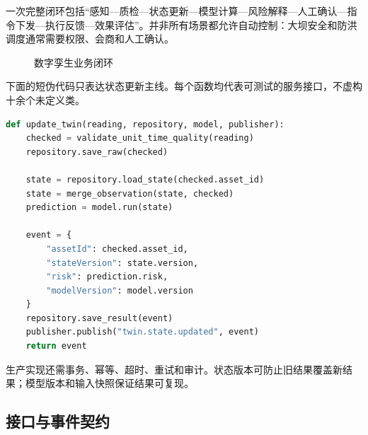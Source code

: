 一次完整闭环包括“感知—质检—状态更新—模型计算—风险解释—人工确认—指令下发—执行反馈—效果评估”。并非所有场景都允许自动控制：大坝安全和防洪调度通常需要权限、会商和人工确认。

\begin{figure}[htbp]
\centering
{}
\caption{数字孪生业务闭环}
\label{fig:dt-closed-loop}
\end{figure}

下面的短伪代码只表达状态更新主线。每个函数均代表可测试的服务接口，不虚构十余个未定义类。

\begin{lstlisting}[language=Python]
def update_twin(reading, repository, model, publisher):
    checked = validate_unit_time_quality(reading)
    repository.save_raw(checked)

    state = repository.load_state(checked.asset_id)
    state = merge_observation(state, checked)
    prediction = model.run(state)

    event = {
        "assetId": checked.asset_id,
        "stateVersion": state.version,
        "risk": prediction.risk,
        "modelVersion": model.version
    }
    repository.save_result(event)
    publisher.publish("twin.state.updated", event)
    return event
\end{lstlisting}

生产实现还需事务、幂等、超时、重试和审计。状态版本可防止旧结果覆盖新结果；模型版本和输入快照保证结果可复现。

\subsection{接口与事件契约}

